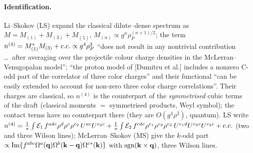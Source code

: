 \paragraph{Identification.} Li--Skokov (LS) expand the classical dilute--dense spectrum as $M=M_{(1)}+M_{(3)}+M_{(5)}$, $M_{(n)}\propto g^n\rho_P^{(n+1)/2}$; the term $n^{(4)}=M_{(1)}^*M_{(3)}+{\rm c.c.}\propto g^4\rho_P^3$ ``does not result in any nontrivial contribution \dots\ after averaging over the projectile colour charge densities in the McLerran--Venugopalan model''; ``the proton model of [Dumitru et al.] includes a nonzero C-odd part of the correlator of three color charges'' and their functional ``can be easily extended to account for non-zero three color charge correlations''. Their charges are classical, so $n^{(4)}$ is the counterpart of the \emph{symmetrised} cubic terms of the draft (classical moments $=$ symmetrised products, Weyl symbol); the contact terms have no counterpart there (they are $O(g^4\rho^2)$, quantum). LS write $n^{(4)}=\frac1\pi\int\mathcal E_1\,f^{ade}\rho^d\rho^e\rho^{e_2}\,U^{ac}U^{e_2c}+\frac1\pi\int\mathcal E_2\,f^{cde}\rho^{e_1}\rho^{e_2}\rho^{e_3}\,U^{e_1d}U^{e_2e}U^{e_3c}+{\rm c.c.}$ (two and three Wilson lines); McLerran--Skokov (MS) give the $k$-odd part $\propto{\rm Im}\{f^{abc}\Omega^a(\mathbf{q})\Omega^b(\mathbf{k}-\mathbf{q})\Omega^{c*}(\mathbf{k})\}$ with ${\rm sgn}(\mathbf{k}\times\mathbf{q})$, three Wilson lines.
